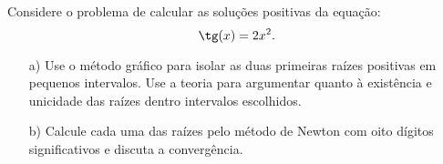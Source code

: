 \begin{exer} Considere o problema de calcular as soluções positivas da equação:
  \begin{equation}
    \tg(x)=2x^2.
  \end{equation}
\begin{itemize}
\item[a)] Use o método gráfico para isolar as duas primeiras raízes positivas em pequenos intervalos. Use a teoria para argumentar quanto à existência e unicidade das raízes dentro intervalos escolhidos.
\item[b)]  Calcule cada uma das raízes pelo método de Newton com oito dígitos significativos e discuta a convergência.%
\end{itemize}
\end{exer}
\ifisscilab
